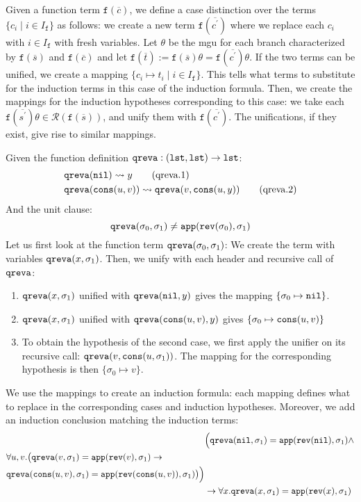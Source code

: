 Given a function term $\mathtt{f}(\overline{c})$, we define a case distinction over the terms $\{c_i\mid i\in I_\mathtt{f}\}$ as follows: we create a new term $\mathtt{f}(\overline{c^\prime})$ where we replace each $c_i$ with $i\in I_\mathtt{f}$ with fresh variables. Let $\theta$ be the mgu for each branch characterized by $\mathtt{f}(\overline{s})$ and $\mathtt{f}(\overline{c})$ and let $\mathtt{f}(\overline{t}):=\mathtt{f}(\overline{s})\theta=\mathtt{f}(\overline{c^\prime})\theta$. If the two terms can be unified, we create a mapping $\{c_i\mapsto t_i\mid i\in I_\mathtt{f}\}$. This tells what terms to substitute for the induction terms in this case of the induction formula. Then, we create the mappings for the induction hypotheses corresponding to this case: we take each $\mathtt{f}(\overline{s^\prime})\theta\in\mathcal{R}(\mathtt{f}(\overline{s}))$, and unify them with $\mathtt{f}(\overline{c^\prime})$. The unifications, if they exist, give rise to similar mappings.

\begin{example}\label{ex:3}
	Given the function definition $\mathtt{qreva} : (\mathtt{lst}, \mathtt{lst})\rightarrow\mathtt{lst}$:
	\begin{align}
	&\mathtt{qreva}(\mathtt{nil})\rightsquigarrow y\label{qreva1}\tag{qreva.1}\\ &\mathtt{qreva}(\mathtt{cons}(u,v))\rightsquigarrow\mathtt{qreva}(v,\mathtt{cons}(u,y))\label{qreva2}\tag{qreva.2}\end{align}
	And the unit clause:
	$$\mathtt{qreva}(\sigma_0,\sigma_1)\neq\mathtt{app}(\mathtt{rev}(\sigma_0),\sigma_1)$$
	Let us first look at the function term $\mathtt{qreva}(\sigma_0,\sigma_1)$:
	We create the term with variables $\mathtt{qreva}(x,\sigma_1)$. Then, we unify with each
	header and recursive call of $\mathtt{qreva}$:
	\begin{enumerate}
		\item $\mathtt{qreva}(x,\sigma_1)$ unified with $\mathtt{qreva}(\mathtt{nil},y)$ gives the mapping $\{\sigma_0\mapsto\mathtt{nil}\}$.
		\item $\mathtt{qreva}(x,\sigma_1)$ unified with $\mathtt{qreva}(\mathtt{cons}(u,v),y)$ gives $\{\sigma_0\mapsto\mathtt{cons}(u,v)\}$
		\item To obtain the hypothesis of the second case, we first apply the unifier on its recursive call: $\mathtt{qreva}(v, \mathtt{cons}(u,\sigma_1))$. The mapping for the corresponding hypothesis is then $\{\sigma_0\mapsto v\}$.
	\end{enumerate}
	We use the mappings to create an induction formula: each mapping defines what to replace in the corresponding cases and induction hypotheses. Moreover, we add an induction conclusion matching the induction terms:
	\begin{align}
    \nonumber	&\Big(\mathtt{qreva}(\mathtt{nil},\sigma_1)=\mathtt{app}(\mathtt{rev}(\mathtt{nil}),\sigma_1)\land\\
	\begin{split}\nonumber&\forall u,v.\big(\mathtt{qreva}(v,\sigma_1)=\mathtt{app}(\mathtt{rev}(v),\sigma_1)\rightarrow\\
	&\mathtt{qreva}(\mathtt{cons}(u,v),\sigma_1)=\mathtt{app}(\mathtt{rev}(\mathtt{cons}(u,v)),\sigma_1)\big)\Big)\end{split}\\
    \nonumber&\rightarrow \forall x.\mathtt{qreva}(x,\sigma_1)=\mathtt{app}(\mathtt{rev}(x),\sigma_1)
	\end{align}
\end{example}


